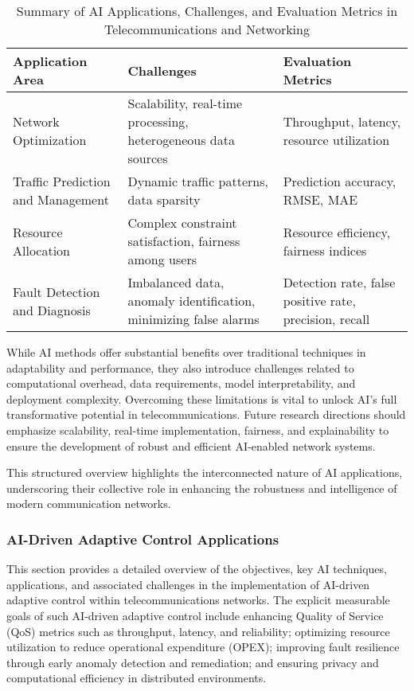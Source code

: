 \documentclass[sigconf]{acmart}
\begin{document}
\begin{table*}[htbp]
\centering
\caption{Summary of AI Applications, Challenges, and Evaluation Metrics in Telecommunications and Networking}
\label{tab:ai_telecom_summary}
\begin{adjustbox}{max width=\textwidth}
\begin{tabular}{@{}lll@{}}
\toprule
\textbf{Application Area} & \textbf{Challenges} & \textbf{Evaluation Metrics} \\ \midrule
Network Optimization & Scalability, real-time processing, heterogeneous data sources & Throughput, latency, resource utilization \\
Traffic Prediction and Management & Dynamic traffic patterns, data sparsity & Prediction accuracy, RMSE, MAE \\
Resource Allocation & Complex constraint satisfaction, fairness among users & Resource efficiency, fairness indices \\
Fault Detection and Diagnosis & Imbalanced data, anomaly identification, minimizing false alarms & Detection rate, false positive rate, precision, recall \\ \bottomrule
\end{tabular}
\end{adjustbox}
\end{table*}

While AI methods offer substantial benefits over traditional techniques in adaptability and performance, they also introduce challenges related to computational overhead, data requirements, model interpretability, and deployment complexity. Overcoming these limitations is vital to unlock AI's full transformative potential in telecommunications. Future research directions should emphasize scalability, real-time implementation, fairness, and explainability to ensure the development of robust and efficient AI-enabled network systems.

This structured overview highlights the interconnected nature of AI applications, underscoring their collective role in enhancing the robustness and intelligence of modern communication networks.

\subsubsection{AI-Driven Adaptive Control Applications}

This section provides a detailed overview of the objectives, key AI techniques, applications, and associated challenges in the implementation of AI-driven adaptive control within telecommunications networks. The explicit measurable goals of such AI-driven adaptive control include enhancing Quality of Service (QoS) metrics such as throughput, latency, and reliability; optimizing resource utilization to reduce operational expenditure (OPEX); improving fault resilience through early anomaly detection and remediation; and ensuring privacy and computational efficiency in distributed environments.
\end{document}
